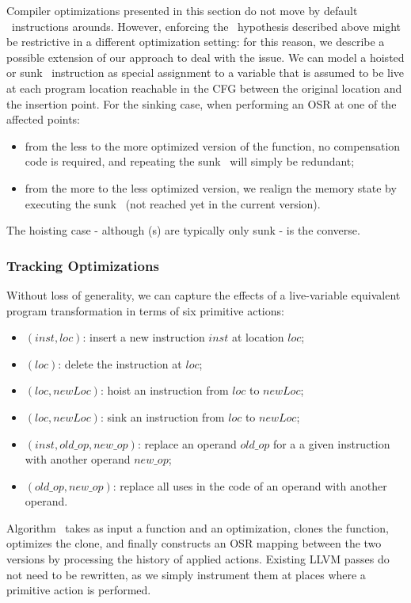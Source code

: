 Compiler optimizations presented in this section do not move by default \store\ instructions arounds. However, enforcing the \store\ hypothesis described above might be restrictive in a different optimization setting: for this reason, we describe a possible extension of our approach to deal with the issue. We can model a hoisted or sunk \store\ instruction as special assignment to a variable that is assumed to be live at each program location reachable in the CFG between the original location and the insertion point. For the sinking case, when performing an OSR at one of the affected points:
\begin{itemize}[itemsep=0pt,parsep=3pt,partopsep=0pt]
 \item from the less to the more optimized version of the function, no compensation code is required, and repeating the sunk \store\ will simply be redundant;
 \item from the more to the less optimized version, we realign the memory state by executing the sunk \store\ (not reached yet in the current version).
\end{itemize}
The hoisting case - although \store(s) are typically only sunk - is the converse.

\subsubsection*{Tracking Optimizations}
Without loss of generality, we can capture the effects of a live-variable equivalent program transformation in terms of six primitive actions:
\begin{itemize}[parsep=0pt,partopsep=0pt]
 \item {}$(inst, loc)$: insert a new instruction $inst$ at location $loc$;
 \item {}$(loc)$: delete the instruction at $loc$;
 \item {}$(loc, newLoc)$: hoist an instruction from $loc$ to $newLoc$;
 \item {}$(loc, newLoc)$: sink an instruction from $loc$ to $newLoc$;
 \item {}$(inst, old\_op, new\_op)$: replace an operand $old\_op$ for a a given instruction with another operand $new\_op$;
 \item {}$(old\_op, new\_op)$: replace all uses in the code of an operand with another operand.
\end{itemize}

\noindent Algorithm \apply\ takes as input a function and an optimization, clones the function, optimizes the clone, and finally constructs an OSR mapping between the two versions by processing the history of applied actions. Existing LLVM passes do not need to be rewritten, as we simply instrument them at places where a primitive action is performed.

